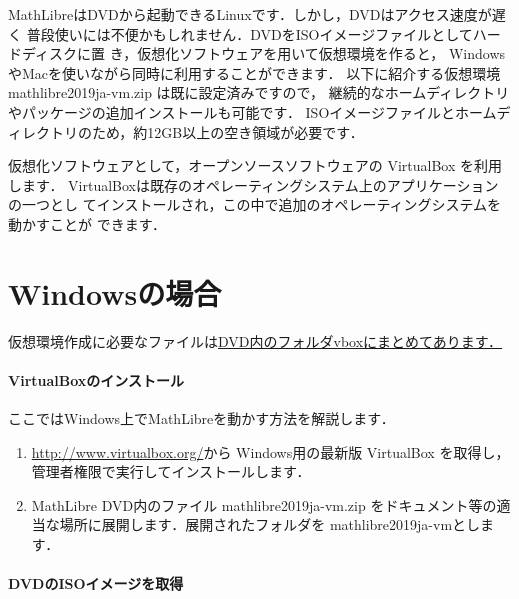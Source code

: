 \documentclass[a4j]{ltjsarticle}
\newcommand{\vboxwin}{VirtualBox-6.0.4-128413-Win.exe}
\newcommand{\vm}{mathlibre2019ja-vm}
\begin{document}
MathLibreはDVDから起動できるLinuxです．しかし，DVDはアクセス速度が遅く
普段使いには不便かもしれません．DVDをISOイメージファイルとしてハードディスクに置
き，仮想化ソフトウェアを用いて仮想環境を作ると，
WindowsやMacを使いながら同時に利用することができます．
以下に紹介する仮想環境 \vm.zip は既に設定済みですので，
継続的なホームディレクトリやパッケージの追加インストールも可能です．
ISOイメージファイルとホームディレクトリのため，約12GB以上の空き領域が必要です．

仮想化ソフトウェアとして，オープンソースソフトウェアの VirtualBox を利用します．
VirtualBoxは既存のオペレーティングシステム上のアプリケーションの一つとし
てインストールされ，この中で追加のオペレーティングシステムを動かすことが
できます．

\section{Windowsの場合}
仮想環境作成に必要なファイルは\underline{DVD内のフォルダvboxにまとめてあります．}\paragraph{VirtualBoxのインストール}
ここではWindows上でMathLibreを動かす方法を解説します．
\begin{enumerate}
 \item %
       \url{http://www.virtualbox.org/}から
       Windows用の最新版 VirtualBox を取得し，管理者権限で実行してインストールします．
 \item MathLibre DVD内のファイル \vm.zip をドキュメント等の適当な場所に展開します．展開されたフォルダを \vm とします．
\end{enumerate}

\paragraph{DVDのISOイメージを取得}
\end{document}
